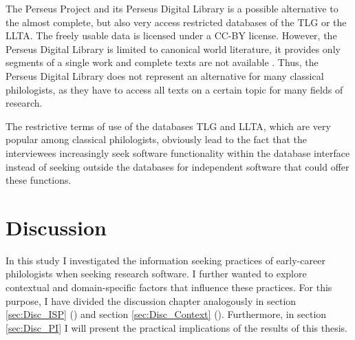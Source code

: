 \documentclass[12pt, a4paper, titlepage, oneside, abstract=true, toc=listof, toc=bibliography, BCOR=1cm]{scrreprt}
\begin{document}
{%
The Perseus Project and its Perseus Digital Library is a possible alternative to the almost complete, but also very access restricted databases of the TLG or the LLTA. The freely usable data is licensed under a CC-BY license. However, the Perseus Digital Library is limited to canonical world literature, it provides only segments of a single work and complete texts are not available \citep{Lang2018}. Thus, the Perseus Digital Library does not represent an alternative for many classical philologists, as they have to access all texts on a certain topic for many fields of research.

The restrictive terms of use of the databases TLG and LLTA, which are very popular among classical philologists, obviously lead to the fact that the interviewees increasingly seek software functionality within the database interface instead of seeking outside the databases for independent software that could offer these functions.

\chapter{Discussion}
\label{sec:discussion}
In this study I investigated the information seeking practices of early-career philologists when seeking research software. I further wanted to explore contextual and domain-specific factors that influence these practices. For this purpose, I have divided the discussion chapter analogously in section \ref{sec:Disc_ISP} () and section \ref{sec:Disc_Context} (). Furthermore, in section \ref{sec:Disc_PI} I will present the practical implications of the results of this thesis.

}
\end{document}

